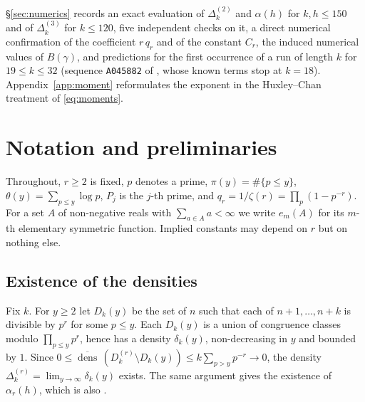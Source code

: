 \documentclass[11pt,reqno]{amsart}
\theoremstyle{plain}
\theoremstyle{definition}
\numberwithin{equation}{section}
\DeclareMathOperator{\dens}{dens}
\begin{document}
\S\ref{sec:numerics} records an exact evaluation of $\Delta^{(2)}_k$ and $\alpha(h)$ for
$k,h\le150$ and of $\Delta^{(3)}_k$ for $k\le120$, five independent checks on it,
a direct numerical confirmation of the coefficient $r\,q_r$ and of the constant $C_r$, the
induced numerical values of $B(\gamma)$, and predictions for the first occurrence of a run
of length $k$ for $19\le k\le32$ (sequence \texttt{A045882} of \cite{OEIS}, whose known
terms stop at $k=18$). Appendix~\ref{app:moment} reformulates the exponent in the
Huxley--Chan treatment of \eqref{eq:moments}.

\section{Notation and preliminaries}\label{sec:prelim}

Throughout, $r\ge2$ is fixed, $p$ denotes a prime, $\pi(y)=\#\{p\le y\}$,
$\theta(y)=\sum_{p\le y}\log p$, $P_j$ is the $j$-th prime, and $q_r=1/\zeta(r)=
\prod_p(1-p^{-r})$. For a set $A$ of non-negative reals with $\sum_{a\in A}a<\infty$ we
write $e_m(A)$ for its $m$-th elementary symmetric function. Implied constants may depend
on $r$ but on nothing else.

\subsection*{Existence of the densities}
Fix $k$. For $y\ge2$ let $D_k(y)$ be the set of $n$ such that each of $n+1,\dots,n+k$ is
divisible by $p^{r}$ for some $p\le y$. Each $D_k(y)$ is a union of congruence classes
modulo $\prod_{p\le y}p^{r}$, hence has a density $\delta_k(y)$, non-decreasing in $y$ and
bounded by $1$. Since
$0\le\overline{\dens}\,(D^{(r)}_k\setminus D_k(y))\le k\sum_{p>y}p^{-r}\to0$, the density
$\Delta^{(r)}_k=\lim_{y\to\infty}\delta_k(y)$ exists. The same argument gives the existence
of $\alpha_r(h)$, which is also \cite[Thm.~4]{Mirsky}.
\end{document}

